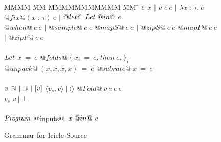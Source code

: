 
\begin{figure}

\begin{tabbing}
MMMM \= MM \= MMMMMMMMMMM \= MM \= \kill
$\mathit{e}$
\GrammarDef $x$
\> $|$ \> $v$
\GrammarAlt $e~e$
\> $|$ \> $\lambda{}x~:~\tau.~e$
\GrammarAlt $@fix@ (x~:~\tau)~e$
\> $|$ \> $@let@~\mathit{Let}~@in@~e$
\\
\GrammarAlt $@when@~e~e$
\> $|$ \> $@sample@~e~e$
\GrammarAlt $@mapS@~e~e$
\> $|$ \> $@zipS@~e~e$
\GrammarAlt $@mapF@~e~e$
\> $|$ \> $@zipF@~e~e$
\\
\\

$\mathit{Let}$
\GrammarDef $x~=~e$
\GrammarAlt $@folds@~\{~x_i~=~e_i~then~e_i~\}_i$
\GrammarAlt $@unpack@~(x,x,x,x)~=~e$
\GrammarAlt $@subrate@~x~=~e$
\\
\\

$\mathit{v}$
\GrammarDef $\mathbb{N} ~|~ \mathbb{B} ~|~ [v]$
\GrammarAlt $\langle v_s, v \rangle ~|~ \langle\rangle$
\GrammarAlt $@Fold@~v~e~e~e$
\\

$v_s$
\GrammarDef $v ~|~ \bot$
\\
\\


$\mathit{Program}$
\GrammarDef @inputs@~$\mathit{x}~@in@~\mathit{e}$ \\
\end{tabbing}

\caption{Grammar for Icicle Source}
\label{fig:source:grammar}
\end{figure}

